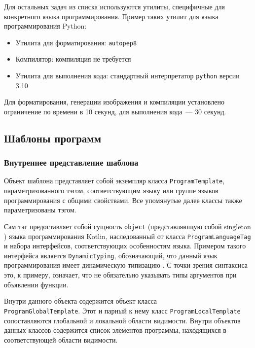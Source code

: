 Для остальных задач из списка используются утилиты, специфичные для конкретного языка программирования.
Пример таких утилит для языка программирования Python\cite{python}:

\begin{itemize}
    \item Утилита для форматирования: \texttt{autopep8}\cite{autopep8}
    \item Компилятор: компиляция не требуется
    \item Утилита для выполнения кода: стандартный интерпретатор \texttt{python} версии 3.10
\end{itemize}

Для форматирования, генерации изображения и компиляции установлено ограничение по времени в 10 секунд,
для выполнения кода~--- 30 секунд.

\subsection{Шаблоны программ}
\subsubsection{Внутреннее представление шаблона} \label{template-classes}
Объект шаблона представляет собой экземпляр класса \texttt{ProgramTemplate},
параметризованного тэгом, соответствующим языку или группе языков программирования с
общими свойствами. Все упомянутые далее классы также параметризованы тэгом.

Сам тэг предоставляет собой сущность \texttt{object} (представляющую собой
singleton \cite{singleton}) языка программирования Kotlin,
наследованный от класса \texttt{ProgramLanguageTag} и набора интерфейсов, соответствующих
особенностям языка. Примером такого интерфейса является \texttt{DynamicTyping},
обозначающий, что данный язык программирования имеет динамическую типизацию
\cite{dynamic-typing}. С точки зрения синтаксиса это, к примеру, означает, что не
обязательно указывать типы аргументов при объявлении функции.

Внутри данного объекта содержится объект класса\\ \texttt{ProgramGlobalTemplate}.
Этот и парный к нему класс \texttt{ProgramLocalTemplate} сопоставляются
глобальной и локальной области видимости. Внутри объектов данных классов
содержится список элементов программы, находящихся в соответствующей области
видимости.

